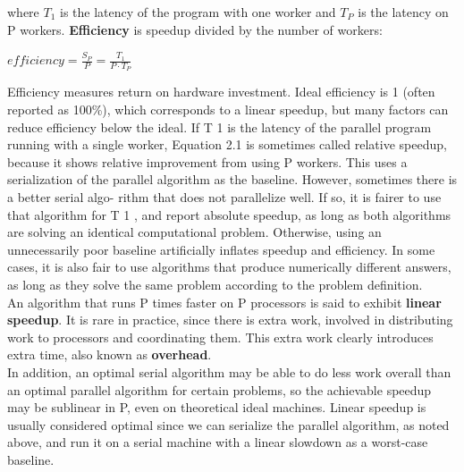 where \(T_{1}\) is the latency of the program with one worker and \(T_{P}\) is the latency on P workers.
\textbf{Efficiency} is speedup divided by the number of workers:
\begin{center}
\(efficiency = \frac{S_{P}}{P} =  \frac{T_{1}}{P \cdot T_{P}}\)
\end{center}
Efficiency measures return on hardware investment. Ideal efficiency is 1 (often reported as 100\%), which corresponds to a linear speedup, but many factors can reduce efficiency below the ideal.
If T 1 is the latency of the parallel program running with a single worker, Equation 2.1 is sometimes
called relative speedup, because it shows relative improvement from using P workers. This uses a
serialization of the parallel algorithm as the baseline. However, sometimes there is a better serial algo-
rithm that does not parallelize well. If so, it is fairer to use that algorithm for T 1 , and report absolute
speedup, as long as both algorithms are solving an identical computational problem. Otherwise, using
an unnecessarily poor baseline artificially inflates speedup and efficiency.
In some cases, it is also fair to use algorithms that produce numerically different answers, as long
as they solve the same problem according to the problem definition.\\ 
An algorithm that runs P times faster on P processors is said to exhibit \textbf{linear speedup}. It is rare in practice, since there is extra work, involved in distributing work to processors and coordinating them. This extra work clearly introduces extra time, also known as \textbf{overhead}.\\
In addition, an optimal serial algorithm may be able to do less work overall than an optimal parallel algorithm for certain problems, so the achievable speedup may be sublinear in P, even
on theoretical ideal machines. Linear speedup is usually considered optimal since we can serialize the parallel algorithm, as noted above, and run it on a serial machine with a linear slowdown as a worst-case baseline.\\
